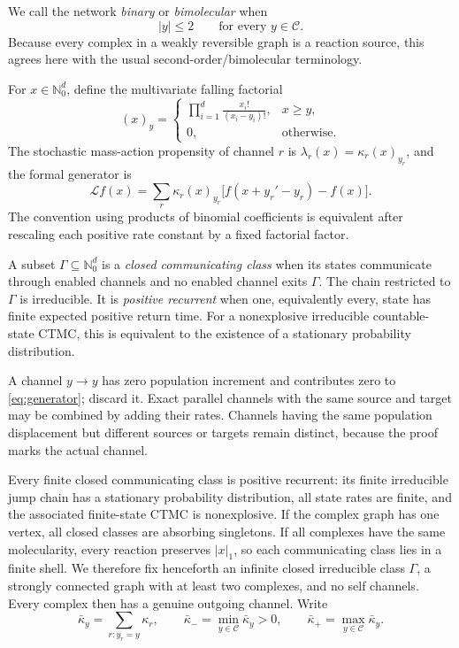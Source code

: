 We call the network \emph{binary} or \emph{bimolecular} when
\begin{equation}\label{eq:binary}
  |y|\le2\qquad\text{for every }y\in\mathcal C.
\end{equation}
Because every complex in a weakly reversible graph is a reaction source, this
agrees here with the usual second-order/bimolecular terminology.

For \(x\in\mathbb N_0^d\), define the multivariate falling factorial
\begin{equation}\label{eq:falling}
  (x)_y=
  \begin{cases}
  \displaystyle\prod_{i=1}^d\frac{x_i!}{(x_i-y_i)!},&x\ge y,\\[1ex]
  0,&\text{otherwise}.
  \end{cases}
\end{equation}
The stochastic mass-action propensity of channel \(r\) is
\(\lambda_r(x)=\kappa_r(x)_{y_r}\), and the formal generator is
\begin{equation}\label{eq:generator}
  \mathcal Lf(x)=\sum_r\kappa_r(x)_{y_r}
  \bigl[f(x+y_r'-y_r)-f(x)\bigr].
\end{equation}
The convention using products of binomial coefficients is equivalent after
rescaling each positive rate constant by a fixed factorial factor.

A subset \(\Gamma\subseteq\mathbb N_0^d\) is a \emph{closed communicating
class} when its states communicate through enabled channels and no enabled
channel exits \(\Gamma\).  The chain restricted to \(\Gamma\) is
irreducible.  It is \emph{positive recurrent} when one, equivalently every,
state has finite expected positive return time.  For a nonexplosive
irreducible countable-state CTMC, this is equivalent to the existence of a
stationary probability distribution.

A channel \(y\to y\) has zero population increment and contributes zero to
\eqref{eq:generator}; discard it.  Exact parallel channels with the same
source and target may be combined by adding their rates.  Channels having the
same population displacement but different sources or targets remain
distinct, because the proof marks the actual channel.

Every finite closed communicating class is positive recurrent: its finite
irreducible jump chain has a stationary probability distribution, all state
rates are finite, and the associated finite-state CTMC is nonexplosive.  If
the complex graph has one vertex, all closed classes are absorbing
singletons.  If all complexes have the same molecularity, every reaction
preserves \(|x|_1\), so each communicating class lies in a finite shell.  We
therefore fix henceforth an infinite closed irreducible class \(\Gamma\), a
strongly connected graph with at least two complexes, and no self channels.
Every complex then has a genuine outgoing channel.  Write
\begin{equation}\label{eq:kbar}
  \bar\kappa_y=\sum_{r:y_r=y}\kappa_r,
  \qquad
  \bar\kappa_- =\min_{y\in\mathcal C}\bar\kappa_y>0,
  \qquad
  \bar\kappa_+ =\max_{y\in\mathcal C}\bar\kappa_y.
\end{equation}

